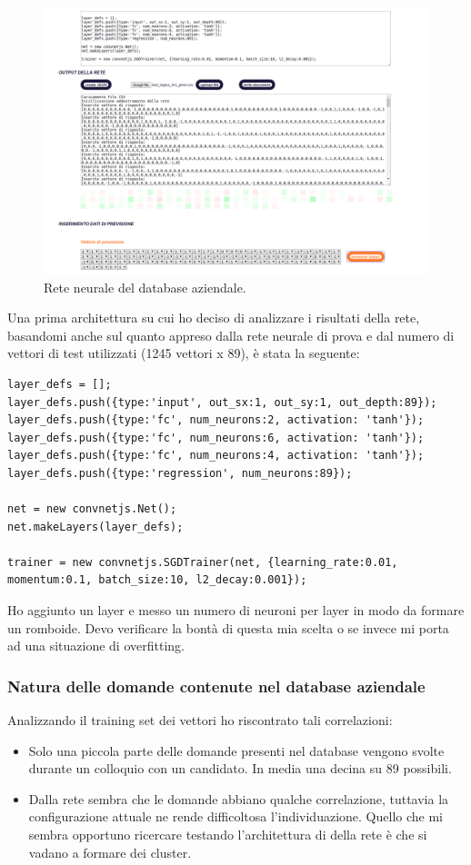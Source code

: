 \begin{figure}[H]
\centering
	\includegraphics[width=0.90\linewidth]{./image/rete_db.png}
	\caption{Rete neurale del database aziendale.}
	\label{Rete neurale del database aziendale.}
\end{figure}
\noindent
Una prima architettura su cui ho deciso di analizzare i risultati della rete, basandomi anche sul quanto appreso dalla rete neurale di prova e dal numero di vettori di test utilizzati (1245 vettori x 89), \`e stata la seguente:
\begin{verbatim}
layer_defs = [];
layer_defs.push({type:'input', out_sx:1, out_sy:1, out_depth:89});
layer_defs.push({type:'fc', num_neurons:2, activation: 'tanh'});
layer_defs.push({type:'fc', num_neurons:6, activation: 'tanh'});
layer_defs.push({type:'fc', num_neurons:4, activation: 'tanh'});
layer_defs.push({type:'regression', num_neurons:89});

net = new convnetjs.Net();
net.makeLayers(layer_defs);

trainer = new convnetjs.SGDTrainer(net, {learning_rate:0.01,
momentum:0.1, batch_size:10, l2_decay:0.001});
\end{verbatim}
Ho aggiunto un layer e messo un numero di neuroni per layer in modo da formare un romboide. Devo verificare la bont\`a di questa mia scelta o se invece mi porta ad una situazione di overfitting.

\subsubsection{Natura delle domande contenute nel database aziendale}
\label{Natura delle domande contenute nel database aziendale}

Analizzando il training set dei vettori ho riscontrato tali correlazioni:
\begin{itemize}
\item Solo una piccola parte delle domande presenti nel database vengono svolte durante un colloquio con un candidato. In media una decina su 89 possibili.
\item Dalla rete sembra che le domande abbiano qualche correlazione, tuttavia la configurazione attuale ne rende difficoltosa l'individuazione. Quello che mi sembra opportuno ricercare testando l'architettura di della rete \`e che si vadano a formare dei cluster.
\end{itemize}



